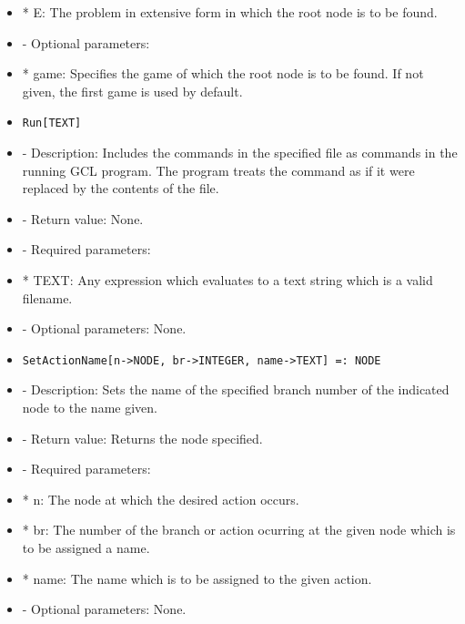 \begin{itemize}
\bd
\item
*  E:  The problem in extensive form in which the root node is to be
found.
\ed

\item
- Optional parameters:

\bd
\item
*  game:  Specifies the game of which the root node is to be found.
If not given, the first game is used by default.
\ed
\ed

\item

\begin{verbatim}
Run[TEXT]
\end{verbatim}

\bd
\item
- Description:  Includes the commands in the specified file as commands 
in the running GCL program.  The program treats the command as if it 
were replaced by the contents of the file.
\item
- Return value:  None.
\item
- Required parameters:
	
\bd
\item
*  TEXT:  Any expression which evaluates to a text string which is a
valid filename.
\ed

\item
- Optional parameters:  None.
\ed
\ed

\item

\begin{verbatim}
SetActionName[n->NODE, br->INTEGER, name->TEXT] =: NODE
\end{verbatim}

\bd
\item
- Description:  Sets the name of the specified branch number of the 
indicated node to the name given.
\item
- Return value:  Returns the node specified.
\item
- Required parameters:
	
\bd
\item
*  n:  The node at which the desired action occurs.
\item
*  br:  The number of the branch or action ocurring at the given node
which is to be assigned a name.
\item
*  name:  The name which is to be assigned to the given action.
\ed

\item
- Optional parameters:  None.


\end{itemize}

